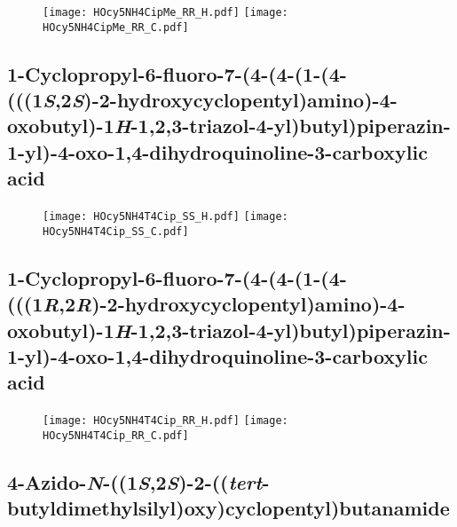 \begin{figure}[H]
	\centering
		\texttt{[image: HOcy5NH4CipMe\_RR\_H.pdf]}
		\texttt{[image: HOcy5NH4CipMe\_RR\_C.pdf]}
\end{figure}

\subsection{1\hyp{}Cyclopropyl\hyp{}6\hyp{}fluoro\hyp{}7\hyp{}(4\hyp{}(4\hyp{}(1\hyp{}(4\hyp{}(((1\textit{S},2\textit{S})\hyp{}2\hyp{}hydroxycyclopentyl)amino)\hyp{}4\hyp{}oxobutyl)\hyp{}1\textit{H}\hyp{}1,2,3\hyp{}triazol\hyp{}4\hyp{}yl)butyl)piperazin\hyp{}1\hyp{}yl)\hyp{}4\hyp{}oxo\hyp{}1,4\hyp{}dihydroquinoline\hyp{}3\hyp{}carboxylic acid }

\begin{figure}[H]
	\centering
		\texttt{[image: HOcy5NH4T4Cip\_SS\_H.pdf]}
		\texttt{[image: HOcy5NH4T4Cip\_SS\_C.pdf]}
\end{figure}

\subsection{1\hyp{}Cyclopropyl\hyp{}6\hyp{}fluoro\hyp{}7\hyp{}(4\hyp{}(4\hyp{}(1\hyp{}(4\hyp{}(((1\textit{R},2\textit{R})\hyp{}2\hyp{}hydroxycyclopentyl)amino)\hyp{}4\hyp{}oxobutyl)\hyp{}1\textit{H}\hyp{}1,2,3\hyp{}triazol\hyp{}4\hyp{}yl)butyl)piperazin\hyp{}1\hyp{}yl)\hyp{}4\hyp{}oxo\hyp{}1,4\hyp{}dihydroquinoline\hyp{}3\hyp{}carboxylic acid }

\begin{figure}[H]
	\centering
		\texttt{[image: HOcy5NH4T4Cip\_RR\_H.pdf]}
		\texttt{[image: HOcy5NH4T4Cip\_RR\_C.pdf]}
\end{figure}

\subsection{4\hyp{}Azido\hyp{}\textit{N}\hyp{}((1\textit{S},2\textit{S})\hyp{}2\hyp{}((\textit{tert}\hyp{}butyldimethylsilyl)oxy)cyclopentyl)butanamide }

